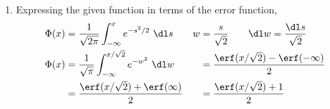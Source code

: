 \begin{enumerate}
    \item Expressing the given function in terms of the error function,
          \begin{align}
              \Phi(x)           & = \frac{1}{\sqrt{2\pi}} \int_{-\infty}^{x}
              e^{-s^2/2}\ \dl s &
              w                 & = \frac{s}{\sqrt{2}} \qquad
              \dl w = \frac{\dl s}{\sqrt{2}}                                           \\
              \Phi(x)           & = \frac{1}{\sqrt{\pi}} \int_{-\infty}^{x/\sqrt{2}}
              e^{-w^2}\ \dl w   &
                                & = \frac{\erf(x/\sqrt{2}) - \erf(-\infty)}{2}         \\
                                & = \frac{\erf(x/\sqrt{2}) + \erf(\infty)}{2}        &
                                & = \frac{\erf(x/\sqrt{2}) + 1}{2}
          \end{align}
\end{enumerate}
